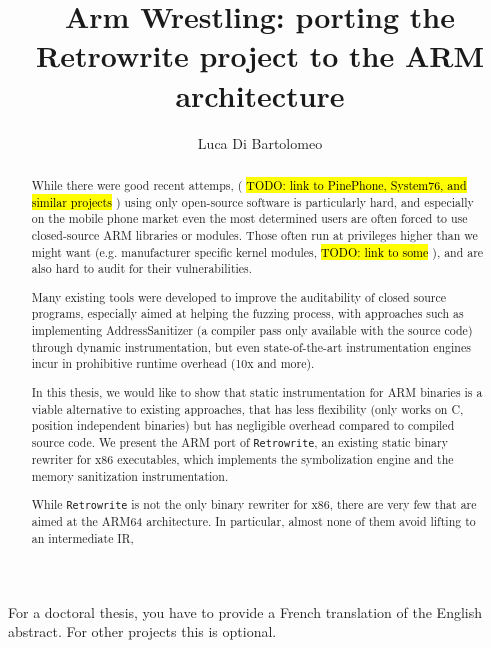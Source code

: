 \documentclass[a4paper,11pt,oneside]{report}
\title{Arm Wrestling: porting the Retrowrite project to the ARM architecture}
\author{Luca Di Bartolomeo} \adviser{Prof. Mathias Payer (EPFL)}
\newcommand{\todo}[1]{%
	\begingroup 
	\sethlcolor{cyan}%
	\hl{TODO: #1}%
	\endgroup
}
\begin{document}
 \maketitle \makededication \makeacks


\begin{abstract}

	While there were good recent attemps, (\todo{link to PinePhone, System76,
	and similar projects}) using only open-source software is particularly
	hard, and especially on the mobile phone market even the most determined
	users are often forced to use closed-source ARM libraries or modules.  
	Those often run at privileges higher than we might want (e.g. manufacturer
	specific kernel modules, \todo{link to some}), and are also hard to audit
	for their vulnerabilities. 

	Many existing tools were developed to improve the auditability of closed
	source programs, especially aimed at helping the fuzzing process, with
	approaches such as implementing AddressSanitizer (a compiler pass only
	available with the source code) through dynamic instrumentation, but even
	state-of-the-art instrumentation engines incur in prohibitive runtime
	overhead (10x and more). 

	In this thesis, we would like to show that static instrumentation for ARM 
	binaries is a viable alternative to existing approaches, that has less 
	flexibility (only works on C, position independent binaries) but has
	negligible overhead compared to compiled source code. We present the ARM
	port of \texttt{Retrowrite}, an existing static binary rewriter for x86
	executables, which implements the symbolization engine and the memory
	sanitization instrumentation. 

	While \texttt{Retrowrite} is not the only binary rewriter for x86, there 
	are very few that are aimed at the ARM64 architecture. In particular, 
	almost none of them avoid lifting to an intermediate IR, 








\end{abstract}

\begin{frenchabstract}
For a doctoral thesis, you have to provide a French translation of the
English abstract. For other projects this is optional.
\end{frenchabstract}

\maketoc
\end{document}
